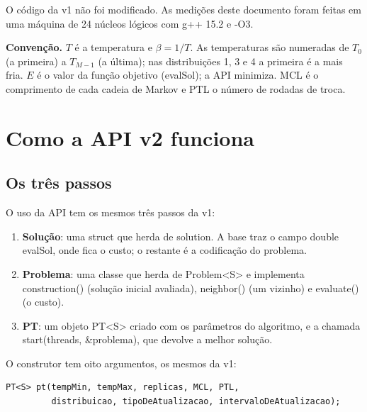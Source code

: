 \documentclass[10pt,a4paper]{article}
\newcommand{\code}[1]{{\ttfamily #1}}
\begin{document}
O código da v1 não foi modificado. As medições deste documento foram feitas em uma máquina de 24 núcleos lógicos com g++ 15.2 e \code{-O3}.

\begin{nota}
\textbf{Convenção.} $T$ é a temperatura e $\beta = 1/T$. As temperaturas são numeradas de $T_{0}$ (a primeira) a $T_{M-1}$ (a última); nas distribuições 1, 3 e 4 a primeira é a mais fria. $E$ é o valor da função objetivo (\code{evalSol}); a API minimiza. MCL é o comprimento de cada cadeia de Markov e PTL o número de rodadas de troca.
\end{nota}

\section{Como a API v2 funciona}\label{s2}

\subsection{Os três passos}

O uso da API tem os mesmos três passos da v1:

\begin{enumerate}
\item \textbf{Solução}: uma \code{struct} que herda de \code{solution}. A base traz o campo \code{double evalSol}, onde fica o custo; o restante é a codificação do problema.
\item \textbf{Problema}: uma classe que herda de \code{Problem<S>} e implementa \code{construction()} (solução inicial avaliada), \code{neighbor()} (um vizinho) e \code{evaluate()} (o custo).
\item \textbf{PT}: um objeto \code{PT<S>} criado com os parâmetros do algoritmo, e a chamada \code{start(\allowbreak{}threads, \&problema)}, que devolve a melhor solução. \end{enumerate}

O construtor tem oito argumentos, os mesmos da v1:

\begin{lstlisting}[style=cpp]
PT<S> pt(tempMin, tempMax, replicas, MCL, PTL,
         distribuicao, tipoDeAtualizacao, intervaloDeAtualizacao);
\end{lstlisting}
\end{document}
